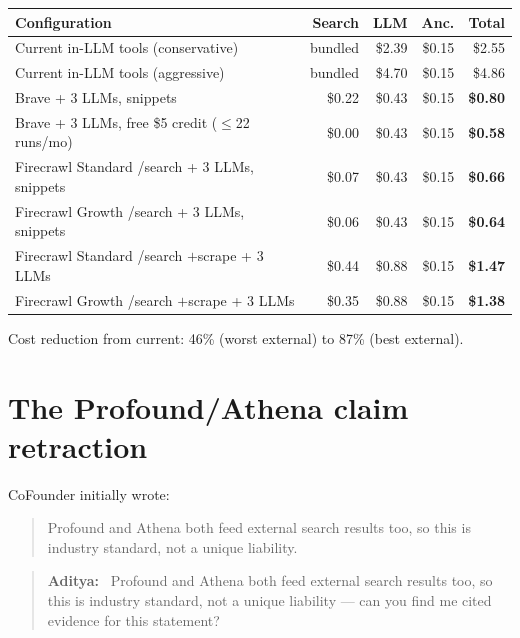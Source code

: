 \documentclass[11pt,letterpaper]{article}
\newenvironment{userturn}
  {\begin{quote}\small\color{brand}\textbf{Aditya:}~}
  {\end{quote}}
\begin{document}
\begin{center}
\begin{tabular}{@{}lrrrr@{}}
\toprule
\textbf{Configuration} & \textbf{Search} & \textbf{LLM} & \textbf{Anc.} & \textbf{Total} \\
\midrule
Current in-LLM tools (conservative)                                    & bundled & \$2.39 & \$0.15 & \$2.55 \\
Current in-LLM tools (aggressive)                                      & bundled & \$4.70 & \$0.15 & \$4.86 \\
Brave + 3 LLMs, snippets                                               & \$0.22  & \$0.43 & \$0.15 & \textbf{\$0.80} \\
Brave + 3 LLMs, free \$5 credit ($\le$22 runs/mo)                      & \$0.00  & \$0.43 & \$0.15 & \textbf{\$0.58} \\
Firecrawl Standard /search + 3 LLMs, snippets                          & \$0.07  & \$0.43 & \$0.15 & \textbf{\$0.66} \\
Firecrawl Growth /search + 3 LLMs, snippets                            & \$0.06  & \$0.43 & \$0.15 & \textbf{\$0.64} \\
Firecrawl Standard /search $+$scrape + 3 LLMs                          & \$0.44  & \$0.88 & \$0.15 & \textbf{\$1.47} \\
Firecrawl Growth /search $+$scrape + 3 LLMs                            & \$0.35  & \$0.88 & \$0.15 & \textbf{\$1.38} \\
\bottomrule
\end{tabular}
\end{center}

Cost reduction from current: 46\% (worst external) to 87\% (best external).

\section{The Profound/Athena claim retraction}

CoFounder initially wrote:

\begin{quote}
Profound and Athena both feed external search results too, so this is
industry standard, not a unique liability.
\end{quote}

\begin{userturn}
Profound and Athena both feed external search results too, so this is
industry standard, not a unique liability --- can you find me cited evidence
for this statement?
\end{userturn}
\end{document}
